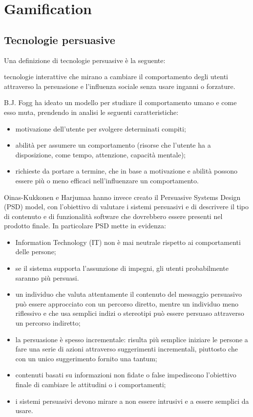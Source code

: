 \chapter{Gamification\label{sec:gamification}}

\section{Tecnologie persuasive\label{sec:tecnologie-persuasive}}

Una definizione di tecnologie persuasive è la seguente:
\begin{quoting}
    \omissis tecnologie interattive che mirano a cambiare il comportamento degli utenti attraverso la persuasione e l'influenza sociale senza usare inganni o forzature. \omissis
\end{quoting}

B.J. Fogg ha ideato un modello per studiare il comportamento umano e come esso muta, prendendo in analisi le seguenti caratteristiche:
\begin{itemize}
    \item motivazione dell'utente per svolgere determinati compiti;
    \item abilità per assumere un comportamento (risorse che l'utente ha a disposizione, come tempo, attenzione, capacità mentale);
    \item richieste da portare a termine, che in base a motivazione e abilità possono essere più o meno efficaci nell'influenzare un comportamento.
\end{itemize}

Oinas-Kukkonen e Harjumaa hanno invece creato il Persuasive Systems Design (PSD) model, con l'obiettivo di valutare i sistemi persuasivi e di descrivere il tipo di contenuto e di funzionalità software che dovrebbero essere presenti nel prodotto finale.
In particolare PSD mette in evidenza:
\begin{itemize}
    \item Information Technology (IT) non è mai neutrale rispetto ai comportamenti delle persone;
    \item se il sistema supporta l'assunzione di impegni, gli utenti probabilmente saranno più persuasi.
    \item un individuo che valuta attentamente il contenuto del messaggio persuasivo può essere approcciato con un percorso diretto, mentre un individuo meno riflessivo e che usa semplici indizi o stereotipi può essere persuaso attraverso un percorso indiretto;
    \item la persuasione è spesso incrementale: risulta più semplice iniziare le persone a fare una serie di azioni attraverso suggerimenti incrementali, piuttosto che con un unico suggerimento fornito una tantum;
    \item contenuti basati su informazioni non fidate o false impediscono l'obiettivo finale di cambiare le attitudini o i comportamenti;
    \item i sistemi persuasivi devono mirare a non essere intrusivi e a essere semplici da usare.
\end{itemize}

